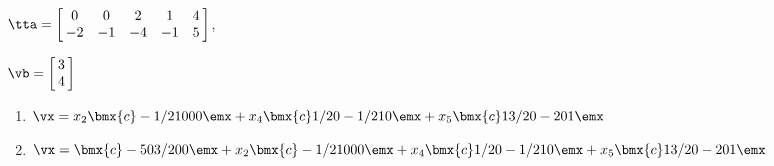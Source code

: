 {$\tta = \left[\hskip -3pt \begin{array}{ccccc} 0&0&2&1&4\\  -2&-1&-4&-1
&5\end{array}\hskip -3pt \right]$, 

$\vb=\left[\hskip -3pt \begin{array}{c} 3\\  4\end{array}\hskip -3pt \right]$}
{\begin{enumerate}
\item	 $\vx=x_2\bmx{c}-1/2\\1\\0\\0\\0\emx+x_4\bmx{c}1/2\\0\\-1/2\\1\\0\emx+x_5\bmx{c}13/2\\0\\-2\\0\\1\emx$

\item	$\vx=\bmx{c}-5\\0\\ 3/2 \\0\\0\emx + x_2\bmx{c}-1/2\\1\\0\\0\\0\emx+x_4\bmx{c}1/2 \\0\\-1/2\\1\\0\emx+x_5\bmx{c}13/2\\0\\-2\\0\\1\emx$
\end{enumerate}}

 



  

